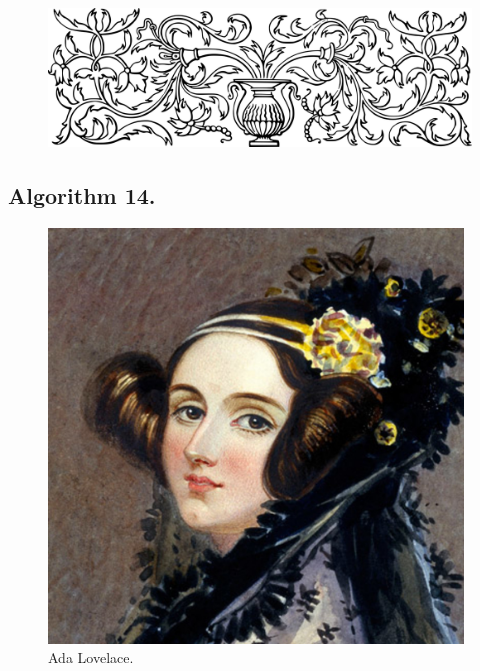 \documentclass[preview]{standalone}
\begin{document}
\begin{figure}[!h]
    \centering
    \includegraphics[width=14cm]{../resources/jpg/3.1.algorithms/border1.png}
\end{figure}
\subsection[Maximum, medium, mean, and mininum.]{
    \color{section} Algorithm 14.
}

\vspace{1\baselineskip}
\begin{center}
    
\end{center}
\pagebreak
\begin{center}
    
\end{center}
\begin{figure}[!h]
    \centering
    \includegraphics[width=11cm]{../resources/jpg/3.1.algorithms/lovelace.jpg}
    \caption*{Ada Lovelace.}
\end{figure}
\pagebreak
\end{document}
